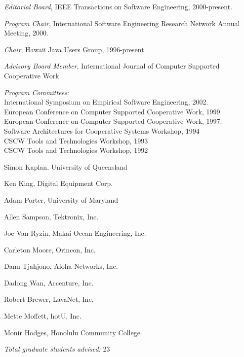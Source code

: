 \begin{Synergistic Activities}
\item {\em Editorial Board}, IEEE Transactions on Software Engineering,
2000-present.

\item {\em Program Chair}, International Software Engineering Research Network
 Annual Meeting, 2000.

\item {\em Chair}, Hawaii Java Users Group, 1996-present

\item {\em Advisory Board Member}, 
  International Journal of Computer Supported Cooperative Work

\item {\em Program Committees}: \\
  International Symposium on Empirical Software Engineering, 2002.\\
  European Conference on Computer Supported Cooperative Work, 1999.\\
  European Conference on Computer Supported Cooperative Work, 1997.\\
  Software Architectures for Cooperative Systems Workshop, 1994 \\
  CSCW Tools and Technologies Workshop, 1993 \\
  CSCW Tools and Technologies Workshop, 1992

\end{Synergistic Activities}



\begin{Collaborators}
\item Simon Kaplan, University of Queensland
\item Ken King, Digital Equipment Corp.
\item Adam Porter, University of Maryland
\item Allen Sampson, Tektronix, Inc.
\item Joe Van Ryzin, Makai Ocean Engineering, Inc.
\end{Collaborators}


\begin{Thesis Advisor and Postgraduate-Scholar Sponsor}
\item Carleton Moore, Orincon, Inc.
\item Danu Tjahjono, Aloha Networks, Inc.
\item Dadong Wan, Accenture, Inc.
\item Robert Brewer, LavaNet, Inc.
\item Mette Moffett, hotU, Inc.
\item Monir Hodges, Honolulu Community College.

\item {\em Total graduate students advised:} 23

\end{Thesis Advisor and Postgraduate-Scholar Sponsor}

